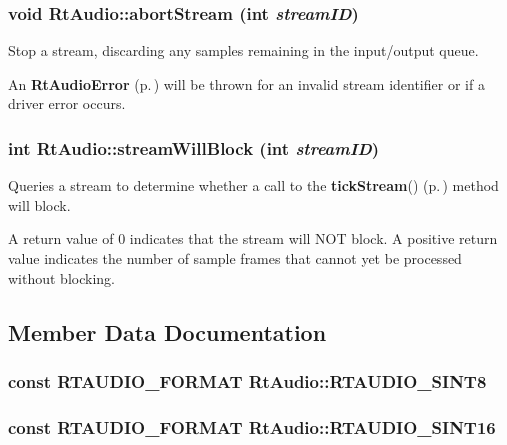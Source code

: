 \subsubsection{\setlength{\rightskip}{0pt plus 5cm}void Rt\-Audio::abort\-Stream (int {\em stream\-ID})}\label{classRtAudio_a13}


Stop a stream, discarding any samples remaining in the input/output queue.

An {\bf Rt\-Audio\-Error} {\rm (p.\,\pageref{classRtAudioError})} will be thrown for an invalid stream identifier or if a driver error occurs. 
\subsubsection{\setlength{\rightskip}{0pt plus 5cm}int Rt\-Audio::stream\-Will\-Block (int {\em stream\-ID})}\label{classRtAudio_a14}


Queries a stream to determine whether a call to the {\bf tick\-Stream}() {\rm (p.\,\pageref{classRtAudio_a9})} method will block.

A return value of 0 indicates that the stream will NOT block. A positive return value indicates the number of sample frames that cannot yet be processed without blocking. 

\subsection{Member Data Documentation}
\subsubsection{\setlength{\rightskip}{0pt plus 5cm}const {\bf RTAUDIO\_\-FORMAT} Rt\-Audio::RTAUDIO\_\-SINT8\hspace{0.3cm}{\tt  [static]}}\label{classRtAudio_p0}


\subsubsection{\setlength{\rightskip}{0pt plus 5cm}const {\bf RTAUDIO\_\-FORMAT} Rt\-Audio::RTAUDIO\_\-SINT16\hspace{0.3cm}{\tt  [static]}}\label{classRtAudio_p1}


